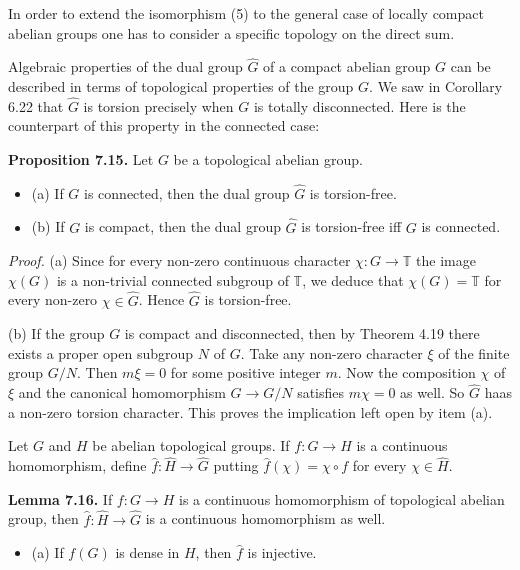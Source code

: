 \documentclass[12pt]{article}
\begin{document}
\begin{itemize}
\begin{itemize}
    In order to extend the isomorphism (5) to the general case of locally compact abelian groups one has to
consider a specific topology on the direct sum.


    Algebraic properties of the dual group $\hat{G}$ of a compact abelian group $G$ can be described in terms of
topological properties of the group $G$. We saw in Corollary 6.22 that $\hat{G}$ is torsion precisely when $G$ is totally
disconnected. Here is the counterpart of this property in the connected case:


\textbf{Proposition 7.15.} Let $G$ be a topological abelian group.


\begin{itemize}

    \item (a) If $G$ is connected, then the dual group $\hat{G}$ is torsion-free.

    \item (b) If $G$ is compact, then the dual group $\hat{G}$ is torsion-free iff $G$ is connected.

\end{itemize}


\emph{Proof.} (a) Since for every non-zero continuous character $\chi : G \to \mathbb{T}$ the image $\chi(G)$ is a non-trivial connected
subgroup of $\mathbb{T}$, we deduce that $\chi(G) = \mathbb{T}$ for every non-zero $\chi \in \hat{G}$. Hence $\hat{G}$ is torsion-free.


    (b) If the group $G$ is compact and disconnected, then by Theorem 4.19 there exists a proper open subgroup
$N$ of $G$. Take any non-zero character $\xi$ of the finite group $G/N$. Then $m \xi = 0$ for some positive integer $m$.
Now the composition $\chi$ of $\xi$ and the canonical homomorphism $G \to G/N$ satisfies $m\chi = 0$ as well. So $\hat{G}$ haas a
non-zero torsion character. This proves the implication left open by item (a).


    Let $G$ and $H$ be abelian topological groups. If $f : G \to H$ is a continuous homomorphism, define $\hat{f}: \hat{H} \to \hat{G}$
putting $\hat{f}(\chi) = \chi \circ f$ for every $\chi \in \hat{H}$.


\textbf{Lemma 7.16.} If $f:G \to H$ is a continuous homomorphism of topological abelian group, then $\hat{f} : \hat{H} \to \hat{G}$ is
a continuous homomorphism as well.


\begin{itemize}

    \item (a) If $f(G)$ is dense in $H$, then $\hat{f}$ is injective.


\end{itemize}
\end{itemize}
\end{itemize}
\end{document}
